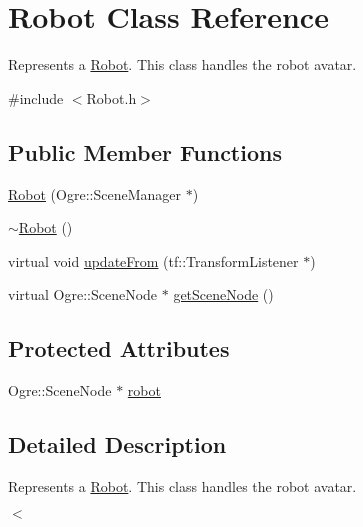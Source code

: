 \hypertarget{classRobot}{\section{\-Robot \-Class \-Reference}
\label{classRobot}
}


\-Represents a \hyperlink{classRobot}{\-Robot}. \-This class handles the robot avatar.  




{\ttfamily \#include $<$\-Robot.\-h$>$}

\subsection*{\-Public \-Member \-Functions}
\begin{DoxyCompactItemize}
\item 
\hyperlink{classRobot_ab888067c4ad969108e95f2f16e0ba4c1}{\-Robot} (\-Ogre\-::\-Scene\-Manager $\ast$)
\item 
\hyperlink{classRobot_a924320124b09c2f2ac1621aa210d5f38}{$\sim$\-Robot} ()
\item 
virtual void \hyperlink{classRobot_ad5504f33bf55e51bd76454d4abda41ea}{update\-From} (tf\-::\-Transform\-Listener $\ast$)
\item 
virtual \-Ogre\-::\-Scene\-Node $\ast$ \hyperlink{classRobot_ae48b638c2034dd967a750789ccd01b8a}{get\-Scene\-Node} ()
\end{DoxyCompactItemize}
\subsection*{\-Protected \-Attributes}
\begin{DoxyCompactItemize}
\item 
\-Ogre\-::\-Scene\-Node $\ast$ \hyperlink{classRobot_a8358d3f22655d77724f21fb762f23c9b}{robot}
\end{DoxyCompactItemize}


\subsection{\-Detailed \-Description}
\-Represents a \hyperlink{classRobot}{\-Robot}. \-This class handles the robot avatar. 

$<$ 

